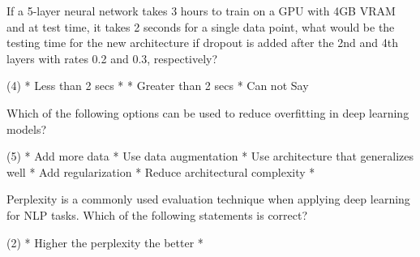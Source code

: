 \documentclass[10pt]{extarticle}
\begin{document}
\begin{exercise}
    If a 5-layer neural network takes 3 hours to train on a GPU with 4GB VRAM and at test time, it takes 2 seconds for a single data point, what would be the testing time for the new architecture if dropout is added after the 2nd and 4th layers with rates 0.2 and 0.3, respectively?
    \begin{choice} (4)
        * Less than 2 secs
        *
        * Greater than 2 secs
        * Can not Say
    \end{choice}
\end{exercise}
\begin{solution}
\end{solution}

\begin{exercise}
    Which of the following options can be used to reduce overfitting in deep learning models?
    \begin{choice} (5)
        * Add more data
        * Use data augmentation 
        * Use architecture that generalizes well
        * Add regularization
        * Reduce architectural complexity
        *
    \end{choice}
\end{exercise}
\begin{solution}
\end{solution}

\begin{exercise}
    Perplexity is a commonly used evaluation technique when applying deep learning for NLP tasks. Which of the following statements is correct?
    \begin{choice} (2)
        * Higher the perplexity the better
        *
    \end{choice}
\end{exercise}
\begin{solution}
\end{solution}
\end{document}
